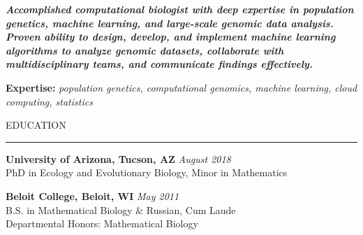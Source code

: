\documentclass{resume} %
\renewenvironment{rSection}[1]{
\sectionskip
\textcolor{RoyalPurple}{\MakeUppercase{#1}}
\sectionlineskip
\hrule
\begin{list}{}{
\setlength{\leftmargin}{1.5em}
}
\item[]
}{
\end{list}
}
\begin{document}
\begin{center}
\textcolor{RoyalPurple}{\bf \em Accomplished computational biologist with deep expertise in population genetics, machine learning, and large-scale genomic data analysis. Proven ability to design, develop, and implement machine learning algorithms to analyze genomic datasets, collaborate with multidisciplinary teams, and communicate findings effectively.}
\end{center}

\textcolor{RoyalPurple}{\bf Expertise:}
\textcolor{RoyalPurple}{\em population genetics, computational genomics, machine learning, cloud computing, statistics}


\begin{rSection}{Education}

{\bf University of Arizona, Tucson, AZ} \hfill {\em August 2018} \\ 
PhD in Ecology and Evolutionary Biology, Minor in Mathematics 

{\bf Beloit College, Beloit, WI} \hfill {\em May 2011} \\ 
B.S. in Mathematical Biology \& Russian, Cum Laude \\
Departmental Honors: Mathematical Biology

\end{rSection}

\end{document}

